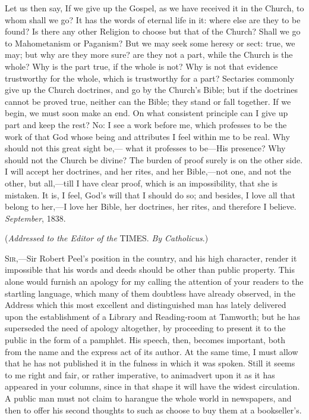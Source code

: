 Let us then say, If we give up the Gospel, as we have received it
in the Church, to whom shall we go? It has the words of eternal life
in it: where else are they to be found? Is there any other Religion to
choose but that of the Church? Shall we go to Mahometanism or
Paganism? But we may seek some heresy or sect: true, we may; but why
are they more sure? are they not a part, while the Church is the
whole? Why is the part true, if the whole is not? Why is not that
evidence trustworthy for the whole, which is trustworthy for a part?
Sectaries commonly give up the Church doctrines, and go by the Church's
Bible; but if the doctrines cannot be proved true, neither can the
Bible; they stand or fall together. If we begin, we must soon make an
end. On what consistent principle can I give up part and keep the
rest? No: I see a work before me, which professes to be the work of
that God whose being and attributes I feel within me to be real. Why
should not this great sight be,— what it professes to be—His
presence? Why should not the Church be divine? The burden of proof
surely is on the other side. I will accept her doctrines, and her
rites, and her Bible,—not one, and not the other, but all,—till I
have clear proof, which is an impossibility, that she is mistaken. It
is, I feel, God's will that I should do so; and besides, I love all
that belong to her,—I love her Bible, her doctrines, her rites, and
therefore I believe.
\emph{September}, 1838.


(\emph{Addressed to the Editor of the}
TIMES. \emph{By Catholicus}.)


S\textsc{ir},—Sir Robert Peel's position in the country, and his
high character, render it impossible that his words and deeds should
be other than public property. This alone would furnish an apology for
my calling the attention of your readers to the startling language,
which many of them doubtless have already observed, in the Address
which this most excellent and distinguished man has lately delivered
upon the establishment of a Library and Reading-room at Tamworth; but
he has superseded the need of apology altogether, by proceeding to
present it to the public in the form of a pamphlet. His speech, then,
becomes important, both from the name and the express act of its
author. At the same time, I must allow that he has not published it in
the fulness in which it was spoken. Still it seems to me right and
fair, or rather imperative, to animadvert upon it as it has appeared
in your columns, since in that shape it will have the widest
circulation. A public man must not claim to harangue the whole world
in newspapers, and then to offer his second thoughts to such as choose
to buy them at a bookseller's.

